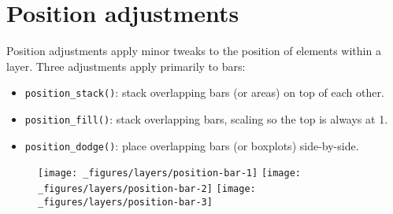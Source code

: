 \hypertarget{sec:position}{%
\section{Position adjustments}\label{sec:position}}


Position adjustments apply minor tweaks to the position of elements
within a layer. Three adjustments apply primarily to bars:

 
  

\begin{itemize}
\tightlist
\item
  \texttt{position\_stack()}: stack overlapping bars (or areas) on top
  of each other.
\item
  \texttt{position\_fill()}: stack overlapping bars, scaling so the top
  is always at 1.
\item
  \texttt{position\_dodge()}: place overlapping bars (or boxplots)
  side-by-side.
\end{itemize}

\begin{Shaded}
\begin{Highlighting}[]
\StringTok{ }\OperatorTok{+}\StringTok{ }
\StringTok{  }\NormalTok{(}\NormalTok{) }\OperatorTok{+}\StringTok{ }\NormalTok{(}\NormalTok{) }\OperatorTok{+}\StringTok{ }\NormalTok{(} \NormalTok{)}
\OperatorTok{+}\StringTok{ }\NormalTok{()}
\OperatorTok{+}\StringTok{ }\NormalTok{(} \NormalTok{)}
\OperatorTok{+}\StringTok{ }\NormalTok{(} \NormalTok{)}
\end{Highlighting}
\end{Shaded}

\begin{figure}[H]
  \texttt{[image: \_figures/layers/position-bar-1]}%
  \texttt{[image: \_figures/layers/position-bar-2]}%
  \texttt{[image: \_figures/layers/position-bar-3]}
\end{figure}

